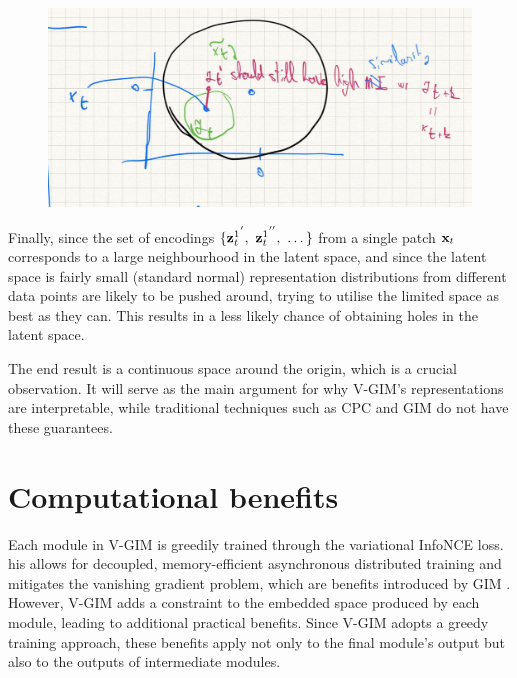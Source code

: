 		\begin{figure} %
			\centering
			\includegraphics[width=0.7\linewidth]{"gaussian neighbourhood"}
			\caption{}
			\label{fig:gaussian-neighbourhood}
		\end{figure}
		
			Finally, since the set of encodings $ \{ {\mathbf{z}_t^1}^{'},~{\mathbf{z}_t^1}^{''},~\dots \}$ from a single patch $\mathbf{x}_t$ corresponds to a large neighbourhood in the latent space, and since the latent space is fairly small (standard normal) representation distributions from different data points are likely to be pushed around, trying to utilise the limited space as best as they can. This results in a less likely chance of obtaining holes in the latent space.
			
			The end result is a continuous space around the origin, which is a crucial observation. It will serve as the main argument for why V-GIM's representations are interpretable, while traditional techniques such as CPC and GIM do not have these guarantees. 

			


		
	
	
	
\section{Computational benefits}
	Each module in V-GIM is greedily trained through the variational InfoNCE loss. his allows for decoupled, memory-efficient asynchronous distributed training and mitigates the vanishing gradient problem, which are benefits introduced by GIM \cite{lowePuttingEndEndtoEnd2020}. However, V-GIM adds a constraint to the embedded space produced by each module, leading to additional practical benefits. Since V-GIM adopts a greedy training approach, these benefits apply not only to the final module's output but also to the outputs of intermediate modules.
	

